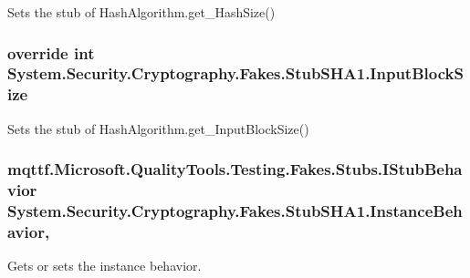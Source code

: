Sets the stub of Hash\-Algorithm.\-get\-\_\-\-Hash\-Size()

\hypertarget{class_system_1_1_security_1_1_cryptography_1_1_fakes_1_1_stub_s_h_a1_ab90ef03156e0a1ec3946e488c1880143}{
\subsubsection[{Input\-Block\-Size}]{\setlength{\rightskip}{0pt plus 5cm}override int System.\-Security.\-Cryptography.\-Fakes.\-Stub\-S\-H\-A1.\-Input\-Block\-Size\hspace{0.3cm}{\ttfamily [get]}}}\label{class_system_1_1_security_1_1_cryptography_1_1_fakes_1_1_stub_s_h_a1_ab90ef03156e0a1ec3946e488c1880143}


Sets the stub of Hash\-Algorithm.\-get\-\_\-\-Input\-Block\-Size()

\hypertarget{class_system_1_1_security_1_1_cryptography_1_1_fakes_1_1_stub_s_h_a1_a0b8d83e879076b4f457b8bdf80dd5d67}{
\subsubsection[{Instance\-Behavior}]{\setlength{\rightskip}{0pt plus 5cm}mqttf.\-Microsoft.\-Quality\-Tools.\-Testing.\-Fakes.\-Stubs.\-I\-Stub\-Behavior System.\-Security.\-Cryptography.\-Fakes.\-Stub\-S\-H\-A1.\-Instance\-Behavior\hspace{0.3cm}{\ttfamily [get]}, {\ttfamily [set]}}}\label{class_system_1_1_security_1_1_cryptography_1_1_fakes_1_1_stub_s_h_a1_a0b8d83e879076b4f457b8bdf80dd5d67}


Gets or sets the instance behavior.

